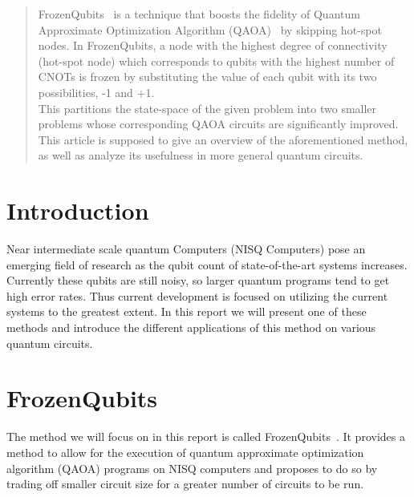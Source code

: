 \begin{abstract}
FrozenQubits~\cite{frozenqubits} is a technique that boosts the fidelity of Quantum Approximate Optimization Algorithm (QAOA)~\cite{qaoa} by skipping hot-spot nodes. In FrozenQubits, a node with the highest degree of connectivity (hot-spot node) which corresponds to qubits with the highest number of CNOTs is frozen by substituting the value of each qubit with its two possibilities, -1 and +1.\\
This partitions the state-space of the given problem into two smaller problems whose corresponding QAOA circuits are significantly improved. This article is supposed to give an overview of the aforementioned method, as well as analyze its usefulness in more general quantum circuits.
\end{abstract}
\section{Introduction}
Near intermediate scale quantum Computers (NISQ Computers) pose an emerging field of research as the qubit count of state-of-the-art systems increases. Currently these qubits are still noisy, so larger quantum programs tend to get high error rates. Thus current development is focused on utilizing the current systems to the greatest extent. In this report we will present one of these methods and introduce the different applications of this method on various quantum circuits.
\section{FrozenQubits}
The method we will focus on in this report is called FrozenQubits~\cite{frozenqubits}. It provides a method to allow for the execution of quantum approximate optimization algorithm (QAOA) programs on NISQ computers and proposes to do so by trading off smaller circuit size for a greater number of circuits to be run.
